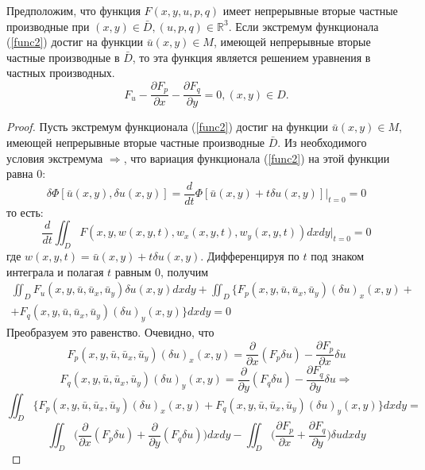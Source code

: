 \begin{theorem}
    Предположим, что функция $F(x, y, u, p, q)$ имеет
    непрерывные вторые частные производные при $(x, y) \in \bar D, (u, p, q) \in \mathbb{R}^3$.
    Если экстремум функционала (\ref{func2}) достиг на функции $\bar u(x, y) \in M$, имеющей непрерывные вторые частные производные в $\bar D$, то эта функция является решением уравнения в частных производных.
    \begin{equation}
        F_u-\frac{\partial F_p}{\partial x}-\frac{\partial F_q}{\partial y}=0, (x,y)\in D.
        \label{resh1}
    \end{equation}
    
\end{theorem}
\begin{proof}
    Пусть экстремум функционала (\ref{func2}) достиг на функции $\bar u(x, y) \in M$, имеющей непрерывные вторые частные производные $\bar D$. Из необходимого условия экстремума $\Longrightarrow$, что вариация
    функционала (\ref{func2}) на этой функции равна 0:
    $$\delta \Phi[\bar u(x,y), \delta u(x,y)]=\frac{d}{dt}\Phi[\bar u(x,y)+t\delta u(x,y)]\Big|_{t=0}=0$$ то есть:
    $$\frac{d}{dt} \iint_D F(x, y, w(x, y, t), w_x(x, y, t), w_y(x, y, t))dxdy\Big|_{t=0}=0$$   
    где $w(x, y, t) = \bar u(x, y) + t\delta u(x, y)$. Дифференцируя по $t$ под знаком интеграла и полагая $t$ равным 0, получим
    \begin{equation}
    \begin{gathered}
        \iint_D F_u(x, y, \bar u, \bar u_x, \bar u_y)\delta u(x, y)dxdy+\iint_D \Big\{F_p(x, y, \bar u, \bar u_x, \bar u_y)(\delta u)_x(x, y)+\\
        +F_q(x, y,\bar u,\bar u_x, \bar u_y)(\delta u)_y(x, y)\Big\}dxdy=0        
    \end{gathered}
        \label{dd}
    \end{equation}
    Преобразуем это равенство. Очевидно, что
    $$F_p(x, y, \bar u, \bar u_x, \bar u_y)(\delta u)_x(x, y)=\frac{\partial}{\partial x}
    (F_p\delta u) - \frac{\partial F_p}{\partial x}\delta u$$
    $$F_q(x, y, \bar u, \bar u_x, \bar u_y)(\delta u)_y(x, y)=\frac{\partial}{\partial y}
    (F_q\delta u) - \frac{\partial F_q}{\partial y}\delta u \Longrightarrow$$
    $$\iint_D \Big\{ F_p(x,y,\bar u, \bar u_x, \bar u_y)(\delta u)_x(x, y)+F_q(x,y,\bar u, \bar u_x, \bar u_y)(\delta u)_y(x, y)\Big\}dxdy=$$
    $$\iint_D \Big( \frac{\partial}{\partial x}(F_p\delta u) + \frac{\partial}{\partial y}(F_q\delta u)\Big)dxdy-\iint_D \Big( \frac{\partial F_p}{\partial x}+\frac{\partial F_q}{\partial y}\Big)\delta u dxdy$$

\end{proof}
